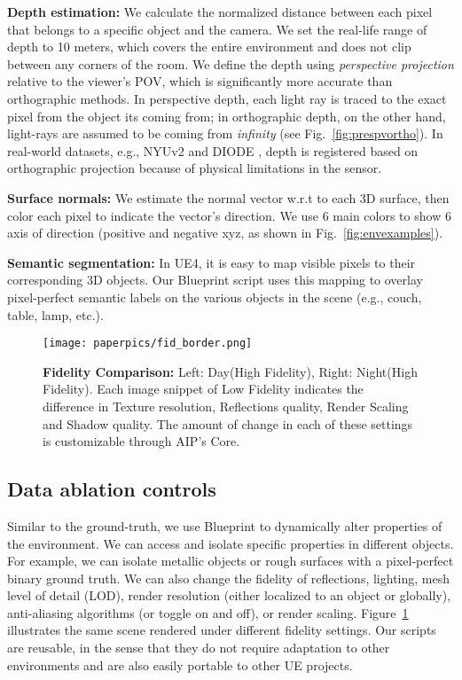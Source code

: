\documentclass[runningheads]{llncs}
\begin{document}
\noindent \textbf{Depth estimation:} We calculate the normalized distance between each pixel that belongs to a specific object and the camera. We set the real-life range of depth to 10 meters, which covers the entire environment and does not clip between any corners of the room. We define the depth using \textit{perspective projection} relative to the viewer's POV, which is significantly more accurate than orthographic methods. In perspective depth, each light ray is traced to the exact pixel from the object its coming from; in orthographic depth, on the other hand, light-rays are assumed to be coming from \textit{infinity} (see Fig.~\ref{fig:prespvortho}). In real-world datasets, e.g., NYUv2 \cite{Silberman:ECCV12} and DIODE \cite{diode_dataset}, depth is registered based on orthographic projection because of physical limitations in the sensor.

\vspace{0.4em}
\noindent\textbf{Surface normals:} We estimate the normal vector w.r.t to each 3D surface, then color each pixel to indicate the vector's direction. We use 6 main colors to show 6 axis of direction (positive and negative xyz, as shown in Fig.~\ref{fig:envexamples}).

\vspace{0.4em}
\noindent\textbf{Semantic segmentation:} In UE4, it is easy to map visible pixels to their corresponding 3D objects. Our Blueprint script uses this mapping to overlay pixel-perfect semantic labels on the various objects in the scene (e.g., couch, table, lamp, etc.). 

\begin{figure}[htbp]
\centerline{\texttt{[image: paperpics/fid\_border.png]}}
\caption{\textbf{Fidelity Comparison:} Left: Day(High Fidelity), Right: Night(High Fidelity). Each image snippet of Low Fidelity indicates the difference in Texture resolution, Reflections quality, Render Scaling and Shadow quality. The amount of change in each of these settings is customizable through AIP's Core.}
\label{fig:fidelityshow}
\vspace{-1em}
\end{figure}

\subsection{Data ablation controls}
Similar to the ground-truth, we use Blueprint to dynamically alter properties of the environment. We can access and isolate specific properties in different objects. For example, we can isolate metallic objects or rough surfaces with a pixel-perfect binary ground truth. We can also change the fidelity of reflections, lighting, mesh level of detail (LOD), render resolution (either localized to an object or globally), anti-aliasing algorithms (or toggle on and off), or render scaling. Figure~\ref{fig:fidelityshow} illustrates the same scene rendered under different fidelity settings. Our scripts are reusable, in the sense that they do not require adaptation to other environments and are also easily portable to other UE projects.
\end{document}
